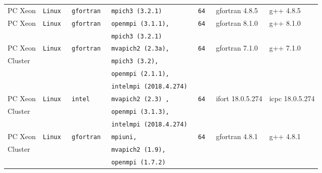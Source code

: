\begin{longtable}{lllllll}
PC Xeon        &\tt Linux  &\tt gfortran     &\tt mpich3 \footnotesize (3.2.1)&\tt 64& gfortran \footnotesize 4.8.5        & g++ \footnotesize 4.8.5           \\
PC Xeon        &\tt Linux  &\tt gfortran     &\tt openmpi \footnotesize (3.1.1),&\tt 64& gfortran \footnotesize 8.1.0      & g++ \footnotesize 8.1.0           \\
               &           &                 &\tt mpich3 \footnotesize (3.2.1) &     &                                     &                                   \\
PC Xeon        &\tt Linux  &\tt gfortran     &\tt mvapich2 \footnotesize (2.3a), &\tt 64 & gfortran \footnotesize 7.1.0    & g++  \footnotesize 7.1.0          \\
Cluster        &           &                 &\tt mpich3 \footnotesize (3.2),    &                 &                                     &                     \\
               &           &                 &\tt openmpi \footnotesize (2.1.1), &                 &                                     &                     \\
               &           &                 &\tt intelmpi \footnotesize (2018.4.274)  &           &                                     &                     \\
PC Xeon        &\tt Linux  &\tt intel        &\tt mvapich2 \footnotesize (2.3) , &\tt 64 & ifort \footnotesize 18.0.5.274   & icpc  \footnotesize 18.0.5.274   \\
Cluster        &           &                 &\tt openmpi \footnotesize (3.1.3), &                 &                                     &                     \\
               &           &                 &\tt intelmpi \footnotesize (2018.4.274)  &           &                                     &                     \\
PC Xeon        &\tt Linux  &\tt gfortran     &\tt mpiuni,   &\tt 64             & gfortran \footnotesize 4.8.1        & g++ \footnotesize 4.8.1                \\
Cluster        &           &                 &\tt mvapich2 \footnotesize (1.9),  &                 &                                     &                     \\
               &           &                 &\tt openmpi \footnotesize(1.7.2)  &                 &                                     &                      \\

\end{longtable}

